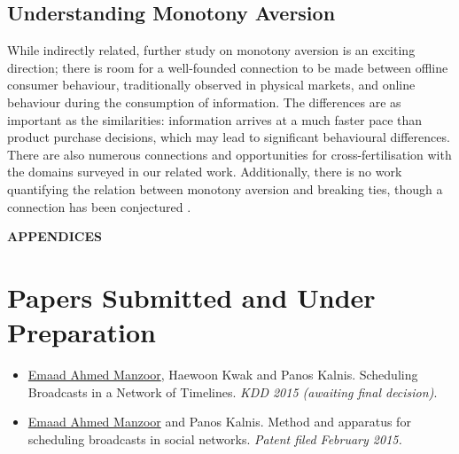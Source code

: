 \documentclass[onecolumn, 12 pt, doublespace, fullpage, letterpaper]{report}
\renewcommand{\thechapter}{\arabic{chapter}}
\renewcommand\bibname{\centering BIBLIOGRAPHY}
\begin{document}
\section{Understanding Monotony Aversion}

While indirectly related, further study on monotony aversion is an exciting direction; there is room for a well-founded connection to be made between offline consumer behaviour, traditionally observed in physical markets, and online behaviour during the consumption of information. The differences are as important as the similarities: information arrives at a much faster pace than product purchase decisions, which may lead to significant behavioural differences. There are also numerous connections and opportunities for cross-fertilisation with the domains surveyed in our related work. Additionally, there is no work quantifying the relation between monotony aversion and breaking ties, though a connection has been conjectured \cite{kwak2011fragile}.

\begin{onehalfspacing}
\renewcommand*\bibname{\centerline{REFERENCES}}
\newcommand{\BIBdecl}{\setlength{\itemsep}{12pt}}%


\end{onehalfspacing}

\appendix

\newpage

\begingroup
\let\clearpage\relax
\begin{center}
\vspace*{2\baselineskip}
\bf\Huge{APPENDICES}
\end{center}
%
\endgroup

%

%
\chapter*{\thechapter \quad Papers Submitted and Under Preparation}

\begin{itemize}
  \item \underline{Emaad Ahmed Manzoor}, Haewoon Kwak and Panos Kalnis. Scheduling Broadcasts in a Network of Timelines. \textit{KDD 2015 (awaiting final decision)}.
  \item \underline{Emaad Ahmed Manzoor} and Panos Kalnis. Method and apparatus for scheduling broadcasts in social networks. \textit{Patent filed February 2015.}
\end{itemize}
\end{document}
